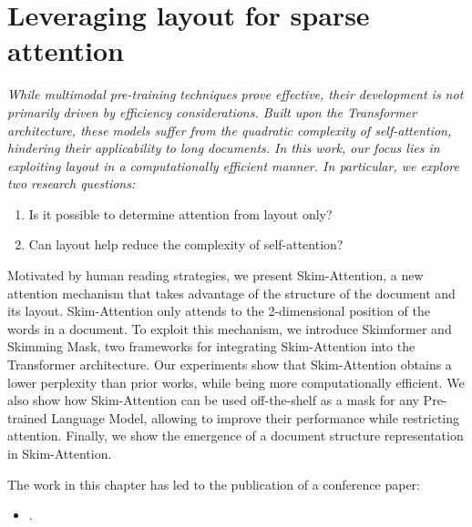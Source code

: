 
\chapter{Leveraging layout for sparse attention}
\label{chapter:skim-attention}

\renewcommand{\leftmark}{\spacedlowsmallcaps{Leveraging layout for sparse attention}}

\begin{chapabstract}
	{\em    
        While multimodal pre-training techniques prove effective, their development is not primarily driven by efficiency considerations. Built upon the Transformer architecture, these models suffer from the quadratic complexity of self-attention, hindering their applicability to long documents. In this work, our focus lies in exploiting layout in a computationally efficient manner. In particular, we explore two research questions: 
        \begin{enumerate}
            \item Is it possible to determine attention from layout only? 
            \item Can layout help reduce the complexity of self-attention? 
        \end{enumerate}
        Motivated by human reading strategies, we present Skim-Attention, a new attention mechanism that takes advantage of the structure of the document and its layout. Skim-Attention only attends to the 2-dimensional position of the words in a document. To exploit this mechanism, we introduce Skimformer and Skimming Mask, two frameworks for integrating Skim-Attention into the Transformer architecture. Our experiments show that Skim-Attention obtains a lower perplexity than prior works, while being more computationally efficient. We also show how Skim-Attention can be used off-the-shelf as a mask for any Pre-trained Language Model, allowing to improve their performance while restricting attention. Finally, we show the emergence of a document structure representation in Skim-Attention.     
	\vspace*{5mm}
	
	The work in this chapter has led to the publication of a conference paper:}
	\begin{itemize}
		\item \small {}.
	\end{itemize}
\end{chapabstract}



